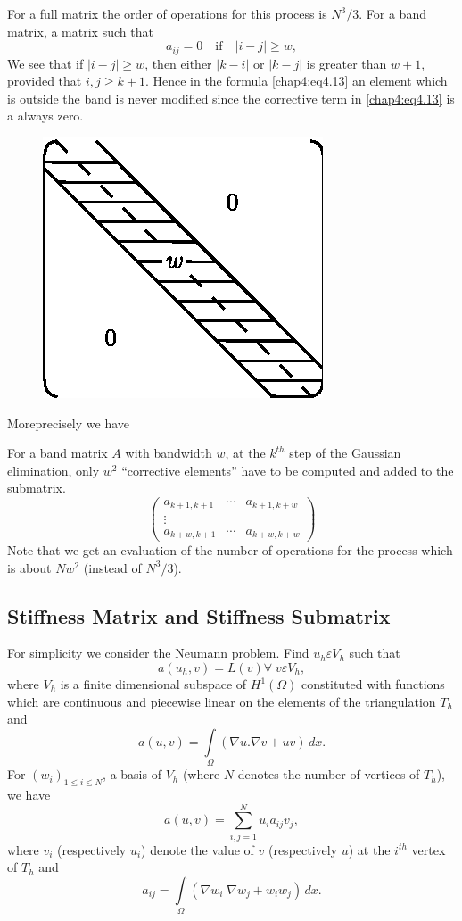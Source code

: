 For a full matrix the order of operations for this process is
$N^3/3$. For a band matrix, \ie a matrix such that 
$$
a_{ij}=0\quad\text{if}\quad |i-j|\geq w,
$$
We see that if $|i-j|\geq w$, then either $|k-i|$ or $|k-j|$ is
greater than $w+1$, provided that $i, j\geq k+1$. Hence in the formula
\eqref{chap4:eq4.13} an element which is outside the band is never
modified since the corrective term in \eqref{chap4:eq4.13} is a
always zero. 
\begin{figure}[H]
\centering
\includegraphics{figure/fig4.3.eps}
\caption{}\label{fig4.3}
\end{figure}

More\pageoriginale precisely we have

\setcounter{propn}{3}
\begin{propn}\label{chap4:propn4}
For a band matrix $A$ with bandwidth $w$, at the $k^{th}$ step of the
Gaussian elimination, only $w^2$ ``corrective elements'' have to be
computed and added to the submatrix.
\begin{equation*}
\begin{pmatrix}
a_{k+1, k+1} & \cdots & a_{k+1, k+w}\\
\vdots \\
a_{k+w, k+1} & \cdots & a_{k+w, k+w}
\end{pmatrix}
\end{equation*}
Note that we get an evaluation of the number of operations for the
process which is about $Nw^2$ (instead of $N^3/3$).
\end{propn}

\subsection{Stiffness Matrix and Stiffness Submatrix}\label{chap4:sec2} 
For simplicity we consider the Neumann problem. Find $u_h\varepsilon
V_h$ such that 
$$
a(u_h, v)=L(v)\forall\; v\varepsilon V_h,
$$
where $V_h$ is a finite dimensional subspace of $H^1(\Omega)$
constituted with functions which are continuous and piecewise linear
on the elements of the triangulation $T_h$ and 
$$
a(u, v)=\int\limits_\Omega(\nabla u.\nabla v+uv)\,dx.
$$\pageoriginale
For $(w_i)_{1\leq i\leq N}$, a basis of $V_h$ (where $N$ denotes the
number of vertices of $T_h$), we have 
$$
a(u, v)=\sum\limits_{i, j=1}^N u_ia_{ij}v_j,
$$
where $v_i$ (respectively $u_i$) denote the value of $v$ (respectively
$u$) at the $i^{th}$ vertex of $T_h$ and
$$
a_{ij}=\int\limits_\Omega (\nabla w_i\; \nabla w_j+w_iw_j)\,dx.
$$

